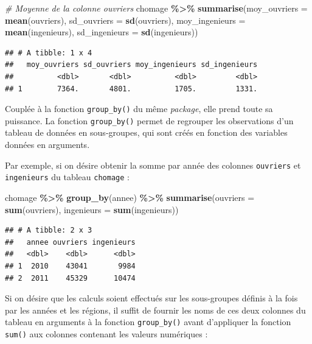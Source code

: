 \documentclass[
  11pt,
]{book}
\newenvironment{Shaded}{\begin{snugshade}}{\end{snugshade}}
\newcommand{\CommentTok}[1]{\textcolor[rgb]{0.56,0.35,0.01}{\textit{#1}}}
\newcommand{\DataTypeTok}[1]{\textcolor[rgb]{0.13,0.29,0.53}{#1}}
\newcommand{\KeywordTok}[1]{\textcolor[rgb]{0.13,0.29,0.53}{\textbf{#1}}}
\newcommand{\NormalTok}[1]{#1}
\newcommand{\OperatorTok}[1]{\textcolor[rgb]{0.81,0.36,0.00}{\textbf{#1}}}
\newcommand{\StringTok}[1]{\textcolor[rgb]{0.31,0.60,0.02}{#1}}
\numberwithin{equation}{section}
\numberwithin{countremarque}{section}
\begin{document}
\begin{Shaded}
\begin{Highlighting}[]
\CommentTok{\# Moyenne de la colonne ouvriers}
\NormalTok{chomage }\OperatorTok{\%\textgreater{}\%}\StringTok{ }
\StringTok{  }\KeywordTok{summarise}\NormalTok{(}\DataTypeTok{moy\_ouvriers =} \KeywordTok{mean}\NormalTok{(ouvriers),}
            \DataTypeTok{sd\_ouvriers =} \KeywordTok{sd}\NormalTok{(ouvriers),}
            \DataTypeTok{moy\_ingenieurs =} \KeywordTok{mean}\NormalTok{(ingenieurs),}
            \DataTypeTok{sd\_ingenieurs =} \KeywordTok{sd}\NormalTok{(ingenieurs))}
\end{Highlighting}
\end{Shaded}

\begin{lstlisting}
## # A tibble: 1 x 4
##   moy_ouvriers sd_ouvriers moy_ingenieurs sd_ingenieurs
##          <dbl>       <dbl>          <dbl>         <dbl>
## 1        7364.       4801.          1705.         1331.
\end{lstlisting}

Couplée à la fonction \texttt{group\_by()} du même \emph{package}, elle prend toute sa puissance. La fonction \texttt{group\_by()} permet de regrouper les observations d'un tableau de données en sous-groupes, qui sont créés en fonction des variables données en arguments.

Par exemple, si on désire obtenir la somme par année des colonnes \texttt{ouvriers} et \texttt{ingenieurs} du tableau \texttt{chomage} :

\begin{Shaded}
\begin{Highlighting}[]
\NormalTok{chomage }\OperatorTok{\%\textgreater{}\%}\StringTok{ }
\StringTok{  }\KeywordTok{group\_by}\NormalTok{(annee) }\OperatorTok{\%\textgreater{}\%}\StringTok{ }
\StringTok{  }\KeywordTok{summarise}\NormalTok{(}\DataTypeTok{ouvriers =} \KeywordTok{sum}\NormalTok{(ouvriers),}
            \DataTypeTok{ingenieurs =} \KeywordTok{sum}\NormalTok{(ingenieurs))}
\end{Highlighting}
\end{Shaded}

\begin{lstlisting}
## # A tibble: 2 x 3
##   annee ouvriers ingenieurs
##   <dbl>    <dbl>      <dbl>
## 1  2010    43041       9984
## 2  2011    45329      10474
\end{lstlisting}

Si on désire que les calculs soient effectués sur les sous-groupes définis à la fois par les années et les régions, il suffit de fournir les noms de ces deux colonnes du tableau en arguments à la fonction \texttt{group\_by()} avant d'appliquer la fonction \texttt{sum()} aux colonnes contenant les valeurs numériques :
\end{document}
